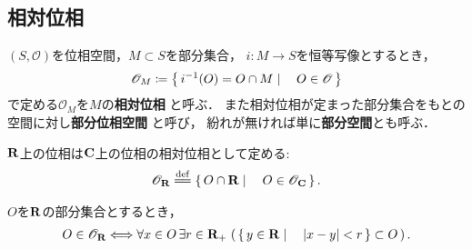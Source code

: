 \subsection{相対位相}
	\begin{screen}
		\begin{dfn}[相対位相]
			$(S,\mathscr{O})$を位相空間，$M \subset S$を部分集合，
			$i:M \longrightarrow S$を恒等写像とするとき，
			\begin{align}
				\mathscr{O}_M \coloneqq 
				\left\{\, i^{-1}(O) = O \cap M \mid \quad O \in \mathscr{O}\, \right\}
			\end{align}
			で定める$\mathscr{O}_M$を$M$の{\bf 相対位相}
			と呼ぶ．
			また相対位相が定まった部分集合をもとの空間に対し{\bf 部分位相空間}
			と呼び，
			紛れが無ければ単に{\bf 部分空間}とも呼ぶ．
		\end{dfn}
	\end{screen}
	
	\begin{screen}
		\begin{dfn}[$\R$上の位相]
			$\R$上の位相は$\mathbf{C}$上の位相の相対位相として定める:
			\begin{align}
				\mathscr{O}_\R \defeq \Set{O \cap \R}{O \in \mathscr{O}_\C}.
			\end{align}
		\end{dfn}
	\end{screen}
	
	\begin{screen}
		\begin{thm}[$\R$の開集合はボールから成る]
			$O$を$\R$の部分集合とするとき，
			\begin{align}
				O \in \mathscr{O}_{\mathbf{R}} \Longleftrightarrow
				\forall x \in O\, \exists r \in \mathbf{R}_+\, \left(\, \left\{\, y \in \mathbf{R} \mid \quad |x-y| < r\, \right\} \subset O\, \right).
			\end{align}
		\end{thm}
	\end{screen}